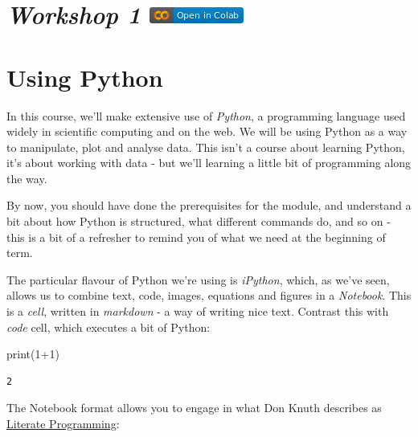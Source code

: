 \documentclass[
  letterpaper,
  DIV=11,
  numbers=noendperiod]{scrreprt}
\newenvironment{Shaded}{\begin{snugshade}}{\end{snugshade}}
\newcommand{\BuiltInTok}[1]{\textcolor[rgb]{0.00,0.23,0.31}{#1}}
\newcommand{\DecValTok}[1]{\textcolor[rgb]{0.68,0.00,0.00}{#1}}
\newcommand{\NormalTok}[1]{\textcolor[rgb]{0.00,0.23,0.31}{#1}}
\newcommand{\OperatorTok}[1]{\textcolor[rgb]{0.37,0.37,0.37}{#1}}
\begin{document}
\hypertarget{workshop-1-open-in-colab}{%
\section[\emph{Workshop 1} ]{\texorpdfstring{\emph{Workshop 1}
\href{https://colab.research.google.com/github/oballinger/QM2/blob/main/notebooks/W01.\%20Python\%20Recap.ipynb}{\protect\includegraphics{notebooks/../colab-badge.png}}}{Workshop 1 Open In Colab}}\label{workshop-1-open-in-colab}}

\hypertarget{using-python}{%
\section{Using Python}\label{using-python}}

In this course, we'll make extensive use of \emph{Python}, a programming
language used widely in scientific computing and on the web. We will be
using Python as a way to manipulate, plot and analyse data. This isn't a
course about learning Python, it's about working with data - but we'll
learning a little bit of programming along the way.

By now, you should have done the prerequisites for the module, and
understand a bit about how Python is structured, what different commands
do, and so on - this is a bit of a refresher to remind you of what we
need at the beginning of term.

The particular flavour of Python we're using is \emph{iPython}, which,
as we've seen, allows us to combine text, code, images, equations and
figures in a \emph{Notebook}. This is a \emph{cell}, written in
\emph{markdown} - a way of writing nice text. Contrast this with
\emph{code} cell, which executes a bit of Python:

\begin{Shaded}
\begin{Highlighting}[]
\BuiltInTok{print}\NormalTok{(}\DecValTok{1}\OperatorTok{+}\DecValTok{1}\NormalTok{)}
\end{Highlighting}
\end{Shaded}

\begin{verbatim}
2
\end{verbatim}

The Notebook format allows you to engage in what Don Knuth describes as
\href{http://en.wikipedia.org/wiki/Literate_programming}{Literate
Programming}:
\end{document}
